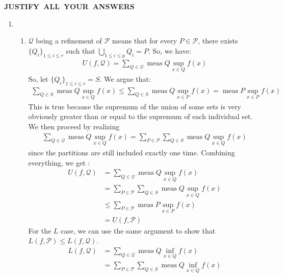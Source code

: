 \documentclass{article}%
\begin{document}
\begin{center}
\textbf{JUSTIFY\ ALL\ YOUR\ ANSWERS}
\end{center}
\begin{enumerate}
    \item \begin{enumerate}
        \item $\mathcal{Q}$ being a refinement of $\mathcal{P}$ means that for every $P \in \mathcal{P}$, there exists $\{Q_i\}_{1 \leq i \leq r}$ such that $\bigcup_{1 \leq i \leq p} Q_i = P$. So, we have:
        \begin{align*}
            U(f, \mathcal{Q}) = \sum_{Q \in \mathcal{Q}} \operatorname{meas} Q \sup_{x \in Q}f(x)
        \end{align*}
        So, let $\{Q_i\}_{1 \leq i \leq r} = S$. We argue that:
        \begin{align*}
            \sum_{Q \in S}\operatorname{meas}Q\sup_{x \in Q}f(x) \leq \sum_{Q \in S}\operatorname{meas}Q\sup_{x \in P}f(x) = \operatorname{meas} P \sup_{x \in P}f(x)
        \end{align*}
        This is true because the supremum of the union of some sets is very obviously greater than or equal to the supremum of each individual set. We then proceed by realizing
        \begin{align*}
            \sum_{Q \in \mathcal{Q}} \operatorname{meas} Q \sup_{x \in Q}f(x) = \sum_{P \in \mathcal{P}} \sum_{Q \in S}\operatorname{meas}Q\sup_{x \in Q}f(x)
        \end{align*}
        since the partitions are still included exactly one time. Combining everything, we get :
        \begin{align*}
            U(f, \mathcal{Q}) &= \sum_{Q \in \mathcal{Q}} \operatorname{meas} Q \sup_{x \in Q}f(x)\\
            &= \sum_{P \in \mathcal{P}} \sum_{Q \in S}\operatorname{meas}Q\sup_{x \in Q}f(x) \\
            &\leq \sum_{P \in \mathcal{P}} \operatorname{meas} P \sup_{x \in P}f(x) \\
            &= U(f, \mathcal{P})
        \end{align*}
        For the $L$ case, we can use the same argument to show that $L(f, \mathcal{P}) \leq L(f, \mathcal{Q})$.
        \begin{align*}
            L(f, \mathcal{Q}) &= \sum_{Q \in \mathcal{Q}} \operatorname{meas} Q \inf_{x \in Q}f(x)\\
            &= \sum_{P \in \mathcal{P}} \sum_{Q \in S}\operatorname{meas}Q\inf_{x \in Q}f(x) \\

\end{align*}
\end{enumerate}
\end{enumerate}
\end{document}
